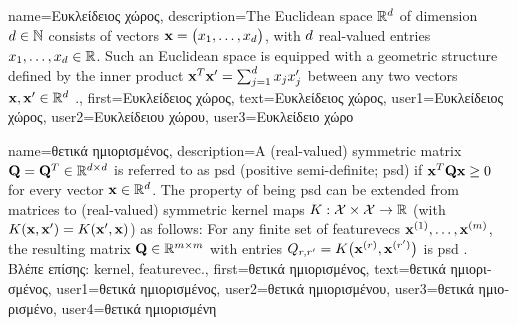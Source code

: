 {name={\foreignlanguage{greek}{Ευκλείδειος χώρος}}, 
	description={The 
		Euclidean space $\mathbb{R}^{d}$ of dimension $d \in \mathbb{N}$ consists 
		of vectors ${\bf x}= \big(x_{1},\ldots,x_{d}\big)$, with $d$ 
		real-valued entries $x_{1},\ldots,x_{d} \in \mathbb{R}$. Such an Euclidean 
		space is equipped with a geometric structure defined by the inner product 
		${\bf x}^{T} {\bf x}' = \sum_{j=1}^{d} x_{j} x'_{j}$ 
		between any two vectors ${\bf x},{\bf x}' \in \mathbb{R}^{d}$ \cite{RudinBookPrinciplesMatheAnalysis}.},
		first={\foreignlanguage{greek}{Ευκλείδειος χώρος}}, 
		text={\foreignlanguage{greek}{Ευκλείδειος χώρος}},
		user1={\foreignlanguage{greek}{Ευκλείδειος χώρος}}, %
  		user2={\foreignlanguage{greek}{Ευκλείδειου χώρου}}, %
		user3={\foreignlanguage{greek}{Ευ\-κλεί\-δει\-ο χώρο}} %
}

{name={\foreignlanguage{greek}{θετικά ημιορισμένος}},
	description={A (real-valued) symmetric matrix $\mathbf{Q} = \mathbf{Q}^{T} \in \mathbb{R}^{d \times d}$ 
	 is referred to as psd (positive semi-definite; psd) if ${\bf x}^{T} \mathbf{Q} {\bf x} \geq 0$ for every vector ${\bf x} \in \mathbb{R}^{d}$. 
	 The property of being psd can be extended from matrices to (real-valued) 
	 symmetric \gls{kernel} maps $K: \mathcal{X} \times \mathcal{X} \rightarrow \mathbb{R}$ 
	 (with $K({\bf x},{\bf x}') = K({\bf x}',{\bf x})$)
	 as follows: For any finite set of \gls{featurevec}s ${\bf x}^{(1)},\dots,{\bf x}^{(m)}$, 
	 the resulting matrix $\mathbf{Q} \in \mathbb{R}^{m \times m}$ with 
	entries $Q_{r,r'} = K\big({\bf x}^{(r)},{\bf x}^{(r')}\big)$ 
	is psd \cite{LearningKernelsBook}.\\
	\foreignlanguage{greek}{Βλέπε επίσης:} \gls{kernel}, \gls{featurevec}.},
	first={\foreignlanguage{greek}{θετικά ημιορισμένος}},
	text={\foreignlanguage{greek}{θετικά ημιορισμένος}},
	user1={\foreignlanguage{greek}{θετικά ημιορισμένος}}, %
  	user2={\foreignlanguage{greek}{θετικά ημιορισμένου}}, %
	user3={\foreignlanguage{greek}{θετικά ημιορισμένο}}, %
	user4={\foreignlanguage{greek}{θετικά ημιορισμένη}} %
}

